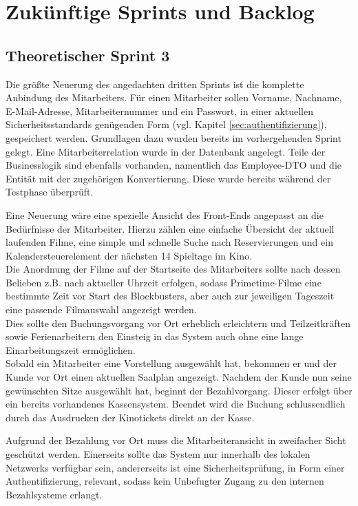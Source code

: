 \section{Zukünftige Sprints und Backlog}

\subsection{Theoretischer Sprint 3}
\label{ssec:theoretischer_sprint}
\multipleauthorsection{\authorRF}{\authorEJ, \authorNL}
Die größte Neuerung des angedachten dritten Sprints ist die komplette Anbindung des Mitarbeiters.
Für einen Mitarbeiter sollen Vorname, Nachname, E-Mail-Adresse, Mitarbeiternummer und ein Passwort, in einer aktuellen Sicherheitsstandards genügenden Form (vgl. Kapitel \vref{sec:authentifizierung}), gespeichert werden.
Grundlagen dazu wurden bereits im vorhergehenden Sprint gelegt.
Eine Mitarbeiterrelation wurde in der Datenbank angelegt.
Teile der Businesslogik sind ebenfalls vorhanden, namentlich das Employee-\acs{DTO} und die Entität mit der zugehörigen Konvertierung.
Diese wurde bereits während der Testphase überprüft.

Eine Neuerung wäre eine spezielle Ansicht des Front-Ends angepasst an die Bedürfnisse der Mitarbeiter.
Hierzu zählen eine einfache Übersicht der aktuell laufenden Filme, eine simple und schnelle Suche nach Reservierungen und ein Kalendersteuerelement der nächsten 14 Spieltage im Kino. \\
Die Anordnung der Filme auf der Startseite des Mitarbeiters sollte nach dessen Belieben z.B. nach aktueller Uhrzeit erfolgen, sodass Primetime-Filme eine bestimmte Zeit vor Start des Blockbusters, aber auch zur jeweiligen Tageszeit eine passende Filmauswahl angezeigt werden. \\
Dies sollte den Buchungsvorgang vor Ort erheblich erleichtern und Teilzeitkräften sowie Ferienarbeitern den Einsteig in das System auch ohne eine lange Einarbeitungszeit ermöglichen. \\

Sobald ein Mitarbeiter eine Vorstellung ausgewählt hat, bekommen er und der Kunde vor Ort einen aktuellen Saalplan angezeigt.
Nachdem der Kunde nun seine gewünschten Sitze ausgewählt hat, beginnt der Bezahlvorgang.
Dieser erfolgt über ein bereits vorhandenes Kassensystem.
Beendet wird die Buchung schlussendlich durch das Ausdrucken der Kinotickets direkt an der Kasse.

Aufgrund der Bezahlung vor Ort muss die Mitarbeiteransicht in zweifacher Sicht geschützt werden.
Einerseits sollte das System nur innerhalb des lokalen Netzwerks verfügbar sein, andererseits ist eine Sicherheitsprüfung, in Form einer Authentifizierung, relevant, sodass kein Unbefugter Zugang zu den internen Bezahlsysteme erlangt.

